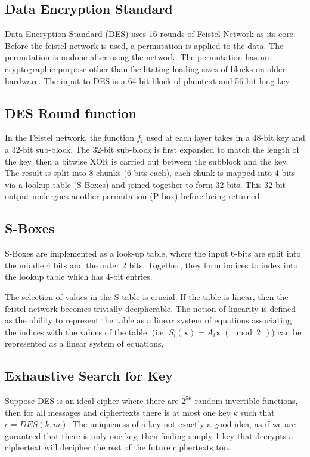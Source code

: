 \documentclass{article}
\begin{document}
\begin{multicols}{2}
\section{Data Encryption Standard}

Data Encryption Standard (DES) uses 16 rounds of Feistel Network as its core. Before the feistel network is used, a permutation is applied to the data. The permutation is undone after using the network. The permutation has no cryptographic purpose other than facilitating loading sizes of blocks on older hardware. The input to DES is a 64-bit block of plaintext and 56-bit long key.

\subsection{DES Round function}

In the Feistel network, the function $f_i$ used at each layer takes in a 48-bit key and a 32-bit sub-block. The 32-bit sub-block is first expanded to match the length of the key, then a bitwise XOR is carried out between the subblock and the key. The result is split into 8 chunks (6 bits each), each chunk is mapped into 4 bits via a lookup table (S-Boxes) and joined together to form 32 bits. This 32 bit output undergoes another permutation (P-box) before being returned.

\subsection{S-Boxes}

S-Boxes are implemented as a look-up table, where the input 6-bits are split into the middle 4 bits and the outer 2 bits. Together, they form indices to index into the lookup table which has 4-bit entries.

The selection of values in the S-table is crucial. If the table is linear, then the feistel network becomes trivially decipherable. The notion of linearity is defined as the ability to represent the table as a linear system of equations associating the indices with the values of the table. (i.e. $S_i(\mathbf{x}) = A_i \mathbf{x} \;(\mod 2\,\;)$) can be represented as a linear system of equations, 

\subsection{Exhaustive Search for Key}

Suppose DES is an ideal cipher where there are $2^{56}$ random invertible functions, then for all messages and ciphertexts there is at most one key $k$ such that $c = DES(k,m)$. The uniqueness of a key not exactly a good idea, as if we are guranteed that there is only one key, then finding simply 1 key that decrypts a ciphertext will decipher the rest of the future ciphertexts too.


\end{multicols}
\end{document}
